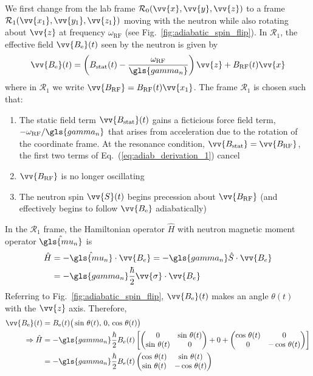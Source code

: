 We first change from the lab frame $\mathcal{R}_0(\vv{x},\vv{y}, \vv{z})$ to a frame $\mathcal{R}_1(\vv{x_1},\vv{y_1}, \vv{z_1})$ moving with the neutron while also rotating about $\vv{z}$ at frequency $\omega_\text{RF}$ (see Fig.~\ref{fig:adiabatic_spin_flip}). In $\mathcal{R}_1$, the effective field $\vv{B_\text{e}}(t)$ seen by the neutron is given by
%
\begin{gather}
    \vv{B_\text{e}}(t)=\left(B_\text{stat}(t)-\frac{\omega_\text{RF}}{\gls{gamma_n}}\right)\vv{z}+B_\text{RF}(t)\vv{x} \label{eq:adiab_derivation_1}
\end{gather}
%
where in $\mathcal{R}_1$ we write $\vv{B_\text{RF}}=B_\text{RF}(t)\vv{x_1}$. The frame $\mathcal{R}_1$ is chosen such that:
%
\begin{enumerate}
    \item The static field term $\vv{B_\text{stat}}(t)$ gains a ficticious force field term, $-\omega_\text{RF}/\gls{gamma_n}$ that arises from acceleration due to the rotation of the coordinate frame. At the resonance condition, $\vv{B_\text{stat}} = \vv{B_\text{RF}}$, the first two terms of Eq.~(\ref{eq:adiab_derivation_1}) cancel
    \item $\vv{B_\text{RF}}$ is no longer oscillating
    \item The neutron spin $\vv{S}(t)$ begins precession about $\vv{B_\text{RF}}$ (and effectively begins to follow $\vv{B_\text{e}}$ adiabatically)
\end{enumerate}
%
In the $\mathcal{R}_1$ frame, the Hamiltonian operator $\hat{H}$ with neutron magnetic moment operator $\hat{\gls{mu_n}}$ is
%
\begin{align}
    \hat{H} &= -\hat{\gls{mu_n}}\cdot\vv{B_{e}}=-\gls{gamma_n}\hat{S}\cdot\vv{B_{e}} \nonumber \\
    &= -\gls{gamma_n}\frac{\hbar}{2}\vv{\sigma}\cdot\vv{B_{e}}
\end{align}
%
Referring to Fig.~\ref{fig:adiabatic_spin_flip}, $\vv{B_\text{e}}(t)$ makes an angle $\theta(t)$ with the $\vv{z}$ axis. Therefore,
%
\begin{align}
    \vv{B_\text{e}}(t) &= B_\text{e}(t)\big(\sin\,\theta(t),\,0,\,\cos\,\theta(t) \big) \\
    \Rightarrow \hat{H} &= -\gls{gamma_n}\frac{\hbar}{2}B_{e}(t)\left[\left(\begin{matrix}
                0 & \sin \, \theta(t)\\
                \sin \, \theta(t) & 0
                \end{matrix}\right)+0+\left(\begin{matrix}
                \cos \, \theta(t) & 0\\
                0 & -\cos \, \theta(t)
                \end{matrix}\right)\right] \nonumber \\
    &= -\gls{gamma_n} \frac{\hbar}{2}B_{e}(t)\left(\begin{matrix}
                \cos \, \theta(t) & \sin \, \theta(t)\\
                \sin \, \theta(t) & -\cos \, \theta(t)
                \end{matrix}\right) \label{eq:adiab_derivation_2}
\end{align}
